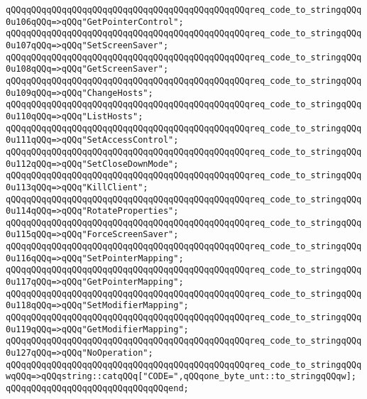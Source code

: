 \verb|qQQqqQQqqQQqqQQqqQQqqQQqqQQqqQQqqQQqqQQqqQQqqQQqreq_code_to_stringqQQq0u106qQQq=>qQQq"GetPointerControl";|\newline
\verb|qQQqqQQqqQQqqQQqqQQqqQQqqQQqqQQqqQQqqQQqqQQqqQQqreq_code_to_stringqQQq0u107qQQq=>qQQq"SetScreenSaver";|\newline
\verb|qQQqqQQqqQQqqQQqqQQqqQQqqQQqqQQqqQQqqQQqqQQqqQQqreq_code_to_stringqQQq0u108qQQq=>qQQq"GetScreenSaver";|\newline
\verb|qQQqqQQqqQQqqQQqqQQqqQQqqQQqqQQqqQQqqQQqqQQqqQQqreq_code_to_stringqQQq0u109qQQq=>qQQq"ChangeHosts";|\newline
\verb|qQQqqQQqqQQqqQQqqQQqqQQqqQQqqQQqqQQqqQQqqQQqqQQqreq_code_to_stringqQQq0u110qQQq=>qQQq"ListHosts";|\newline
\verb|qQQqqQQqqQQqqQQqqQQqqQQqqQQqqQQqqQQqqQQqqQQqqQQqreq_code_to_stringqQQq0u111qQQq=>qQQq"SetAccessControl";|\newline
\verb|qQQqqQQqqQQqqQQqqQQqqQQqqQQqqQQqqQQqqQQqqQQqqQQqreq_code_to_stringqQQq0u112qQQq=>qQQq"SetCloseDownMode";|\newline
\verb|qQQqqQQqqQQqqQQqqQQqqQQqqQQqqQQqqQQqqQQqqQQqqQQqreq_code_to_stringqQQq0u113qQQq=>qQQq"KillClient";|\newline
\verb|qQQqqQQqqQQqqQQqqQQqqQQqqQQqqQQqqQQqqQQqqQQqqQQqreq_code_to_stringqQQq0u114qQQq=>qQQq"RotateProperties";|\newline
\verb|qQQqqQQqqQQqqQQqqQQqqQQqqQQqqQQqqQQqqQQqqQQqqQQqreq_code_to_stringqQQq0u115qQQq=>qQQq"ForceScreenSaver";|\newline
\verb|qQQqqQQqqQQqqQQqqQQqqQQqqQQqqQQqqQQqqQQqqQQqqQQqreq_code_to_stringqQQq0u116qQQq=>qQQq"SetPointerMapping";|\newline
\verb|qQQqqQQqqQQqqQQqqQQqqQQqqQQqqQQqqQQqqQQqqQQqqQQqreq_code_to_stringqQQq0u117qQQq=>qQQq"GetPointerMapping";|\newline
\verb|qQQqqQQqqQQqqQQqqQQqqQQqqQQqqQQqqQQqqQQqqQQqqQQqreq_code_to_stringqQQq0u118qQQq=>qQQq"SetModifierMapping";|\newline
\verb|qQQqqQQqqQQqqQQqqQQqqQQqqQQqqQQqqQQqqQQqqQQqqQQqreq_code_to_stringqQQq0u119qQQq=>qQQq"GetModifierMapping";|\newline
\verb|qQQqqQQqqQQqqQQqqQQqqQQqqQQqqQQqqQQqqQQqqQQqqQQqreq_code_to_stringqQQq0u127qQQq=>qQQq"NoOperation";|\newline
\verb|qQQqqQQqqQQqqQQqqQQqqQQqqQQqqQQqqQQqqQQqqQQqqQQqreq_code_to_stringqQQqwqQQq=>qQQqstring::catqQQq["CODE=",qQQqone_byte_unt::to_stringqQQqw];|\newline
\verb|qQQqqQQqqQQqqQQqqQQqqQQqqQQqqQQqend;|\newline
